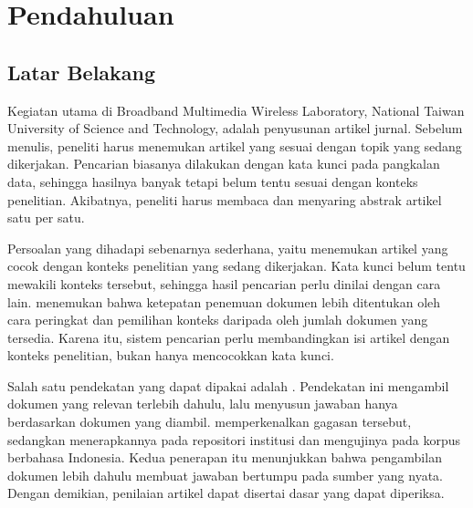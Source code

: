 \chapter{Pendahuluan}

\section{Latar Belakang}

Kegiatan utama di Broadband Multimedia Wireless Laboratory, National Taiwan
University of Science and Technology, adalah penyusunan artikel jurnal. Sebelum
menulis, peneliti harus menemukan artikel yang sesuai dengan topik yang sedang
dikerjakan. Pencarian biasanya dilakukan dengan kata kunci pada pangkalan data,
sehingga hasilnya banyak tetapi belum tentu sesuai dengan konteks penelitian.
Akibatnya, peneliti harus membaca dan menyaring abstrak artikel satu per satu.

Persoalan yang dihadapi sebenarnya sederhana, yaitu menemukan artikel yang
cocok dengan konteks penelitian yang sedang dikerjakan. Kata kunci belum tentu
mewakili konteks tersebut, sehingga hasil pencarian perlu dinilai dengan cara
lain. \citet{asmaidin2026evaluasi} menemukan bahwa ketepatan penemuan dokumen
lebih ditentukan oleh cara peringkat dan pemilihan konteks daripada oleh jumlah
dokumen yang tersedia. Karena itu, sistem pencarian perlu membandingkan isi
artikel dengan konteks penelitian, bukan hanya mencocokkan kata kunci.

Salah satu pendekatan yang dapat dipakai adalah . Pendekatan ini mengambil dokumen yang relevan terlebih dahulu,
lalu menyusun jawaban hanya berdasarkan dokumen yang diambil.
\citet{lewis2020retrieval} memperkenalkan gagasan tersebut, sedangkan
\citet{budi2024repositori} menerapkannya pada repositori institusi dan
\citet{tohir2024utilizing} mengujinya pada korpus berbahasa Indonesia. Kedua
penerapan itu menunjukkan bahwa pengambilan dokumen lebih dahulu membuat
jawaban bertumpu pada sumber yang nyata. Dengan demikian, penilaian artikel
dapat disertai dasar yang dapat diperiksa.

